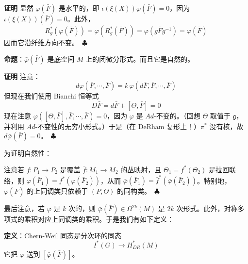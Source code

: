 \textbf{证明} 显然 $\varphi(\bar F)$ 是水平的，即 $\iota(\xi(X))\varphi(\bar F)=0$，因为 $\iota(\xi(X))(\bar F)=0$。此外，
\begin{equation}
  R_g^*(\varphi(\bar F)) = \varphi(R_g^*(\bar F)) = \varphi(g\bar Fg^{-1}) = \varphi(\bar F)
  \tag{I.11}
  \label{eq:I.11}
\end{equation}
因而它沿纤维方向不变。\ $\clubsuit$

\textbf{命题}：$\bar\varphi(\bar F)$ 是底空间 $M$ 上的闭微分形式。而且它是自然的。

\textbf{证明} 注意：
\begin{equation}
  d\varphi(\bar F,\cdots,\bar F) = k\,\varphi(d\bar F,\bar F,\cdots,\bar F)
  \tag{I.12}
  \label{eq:I.12}
\end{equation}
但现在我们使用 Bianchi 恒等式
\begin{equation}
  D\bar F = d\bar F + [\Theta,\bar F] = 0
  \tag{I.13}
  \label{eq:I.13}
\end{equation}
现在注意 $\varphi([\Theta,\bar F],\bar F,\cdots,\bar F)=0$，因为 $\varphi$ 是 $Ad$-不变的。（回想 $\Theta$ 取值于 $\mathfrak{g}$，并利用 $Ad$-不变性的无穷小形式。）于是（在 DeRham 复形上！）$\pi^*$ 没有核，故 $d\bar\varphi(\bar F)=0$。\ $\clubsuit$


为证明自然性：

注意若 $f: P_1\to P_2$ 是覆盖 $\bar f: M_1\to M_2$ 的丛映射，且 $\Theta_1=f^*(\Theta_2)$ 是拉回联络，则 $\varphi(\bar F_1)=f^*(\varphi(\bar F_2))$，从而 $\bar\varphi(\bar F_1)=\bar f^*(\bar\varphi(\bar F_2))$。特别地，$\bar\varphi(\bar F)$ 的上同调类只依赖于 $(P,\Theta)$ 的同构类。\ $\clubsuit$

最后注意，若 $\varphi$ 是 $k$ 次的，则 $\bar\varphi(\bar F)\in\Omega^{2k}(M)$ 是 $2k$ 次形式。此外，对称多项式的乘积对应上同调类的乘积。于是我们有如下定义：

\textbf{定义}：Chern-Weil 同态是分次环的同态
\begin{equation}
  I^*(G)\to H^*_{DR}(M)
  \tag{I.14}
  \label{eq:I.14}
\end{equation}
它把 $\varphi$ 送到 $[\bar\varphi(\bar F)]$。

